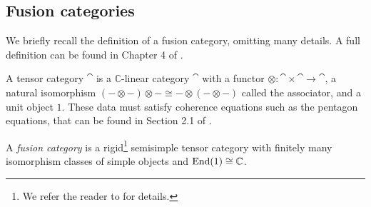 
\subsection{Fusion categories}

We briefly recall the definition of a fusion category, omitting many details. A full definition can be found in Chapter 4 of \cite{Etingof2015}.
\begin{definition}
	A tensor category $\cat$ is a $\mathbb{C}$-linear category $\cat$ with a functor $\otimes:\cat\times\cat\to\cat$, a natural isomorphism $(-\otimes-)\otimes-\cong-\otimes(-\otimes-)$ called the associator, and a unit object $1$.
	These data must satisfy coherence equations such as the pentagon equations, that can be found in Section 2.1 of \cite{Etingof2015}.
	
	A \emph{fusion category} is a rigid\footnote{We refer the reader to \cite{Etingof2015} for details.} semisimple tensor category with finitely many isomorphism classes of simple objects and $\operatorname{End}(1)\cong \mathbb{C}$.
	

\end{definition}
